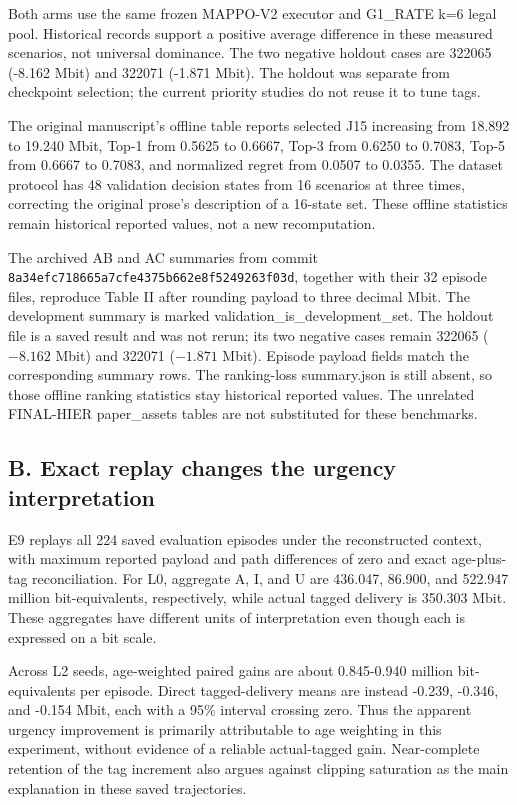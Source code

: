 Both arms use the same frozen MAPPO-V2 executor and G1\_RATE k=6 legal pool. Historical records support a positive average difference in these measured scenarios, not universal dominance. The two negative holdout cases are 322065 (-8.162 Mbit) and 322071 (-1.871 Mbit). The holdout was separate from checkpoint selection; the current priority studies do not reuse it to tune tags.

The original manuscript's offline table reports selected J15 increasing from 18.892 to 19.240 Mbit, Top-1 from 0.5625 to 0.6667, Top-3 from 0.6250 to 0.7083, Top-5 from 0.6667 to 0.7083, and normalized regret from 0.0507 to 0.0355. The dataset protocol has 48 validation decision states from 16 scenarios at three times, correcting the original prose's description of a 16-state set. These offline statistics remain historical reported values, not a new recomputation.

The archived AB and AC summaries from commit \nolinkurl{8a34efc718665a7cfe4375b662e8f5249263f03d}, together with their 32 episode files, reproduce Table II after rounding payload to three decimal Mbit. The development summary is marked validation\_is\_development\_set. The holdout file is a saved result and was not rerun; its two negative cases remain 322065 ($-8.162$ Mbit) and 322071 ($-1.871$ Mbit). Episode payload fields match the corresponding summary rows. The ranking-loss summary.json is still absent, so those offline ranking statistics stay historical reported values. The unrelated FINAL-HIER paper\_assets tables are not substituted for these benchmarks.

\subsection*{B. Exact replay changes the urgency interpretation}

E9 replays all 224 saved evaluation episodes under the reconstructed context, with maximum reported payload and path differences of zero and exact age-plus-tag reconciliation. For L0, aggregate A, I, and U are 436.047, 86.900, and 522.947 million bit-equivalents, respectively, while actual tagged delivery is 350.303 Mbit. These aggregates have different units of interpretation even though each is expressed on a bit scale.

Across L2 seeds, age-weighted paired gains are about 0.845-0.940 million bit-equivalents per episode. Direct tagged-delivery means are instead -0.239, -0.346, and -0.154 Mbit, each with a 95\% interval crossing zero. Thus the apparent urgency improvement is primarily attributable to age weighting in this experiment, without evidence of a reliable actual-tagged gain. Near-complete retention of the tag increment also argues against clipping saturation as the main explanation in these saved trajectories.

